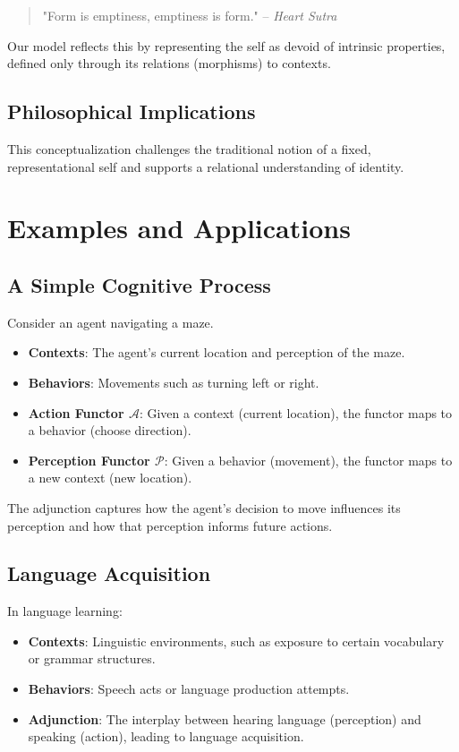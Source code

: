 \documentclass{article}
\begin{document}
\begin{quote} "Form is emptiness, emptiness is form." -- \textit{Heart Sutra} \end{quote}

Our model reflects this by representing the self as devoid of intrinsic properties, defined only through its relations (morphisms) to contexts.

\subsection{Philosophical Implications}

This conceptualization challenges the traditional notion of a fixed, representational self and supports a relational understanding of identity.

\section{Examples and Applications}

\subsection{A Simple Cognitive Process}

Consider an agent navigating a maze.

\begin{itemize} \item \textbf{Contexts}: The agent's current location and perception of the maze. \item \textbf{Behaviors}: Movements such as turning left or right. \item \textbf{Action Functor $\mathcal{A}$}: Given a context (current location), the functor maps to a behavior (choose direction). \item \textbf{Perception Functor $\mathcal{P}$}: Given a behavior (movement), the functor maps to a new context (new location). \end{itemize}

The adjunction captures how the agent's decision to move influences its perception and how that perception informs future actions.

\subsection{Language Acquisition}

In language learning:

\begin{itemize} \item \textbf{Contexts}: Linguistic environments, such as exposure to certain vocabulary or grammar structures. \item \textbf{Behaviors}: Speech acts or language production attempts. \item \textbf{Adjunction}: The interplay between hearing language (perception) and speaking (action), leading to language acquisition. \end{itemize}
\end{document}
